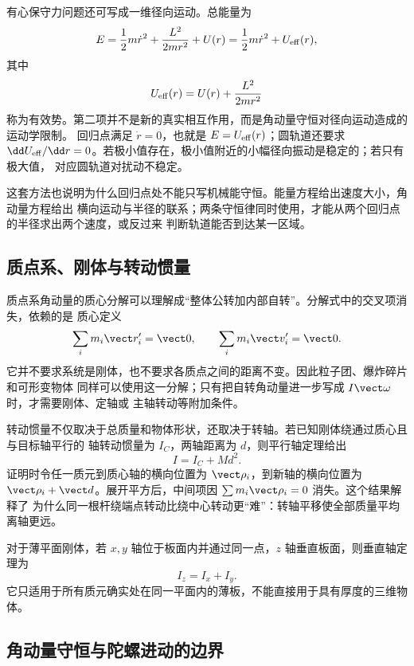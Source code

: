 有心保守力问题还可写成一维径向运动。总能量为
\begin{equation}
 E=\frac12m\dot r^2+\frac{L^2}{2mr^2}+U(r)
 =\frac12m\dot r^2+U_{\rm eff}(r),
\end{equation}
其中
\begin{equation}
 U_{\rm eff}(r)=U(r)+\frac{L^2}{2mr^2}
\end{equation}
称为有效势。第二项并不是新的真实相互作用，而是角动量守恒对径向运动造成的运动学限制。
回归点满足 $\dot r=0$，也就是 $E=U_{\rm eff}(r)$；圆轨道还要求
$\dd U_{\rm eff}/\dd r=0$。若极小值存在，极小值附近的小幅径向振动是稳定的；若只有极大值，
对应圆轨道对扰动不稳定。

这套方法也说明为什么回归点处不能只写机械能守恒。能量方程给出速度大小，角动量方程给出
横向运动与半径的联系；两条守恒律同时使用，才能从两个回归点的半径求出两个速度，或反过来
判断轨道能否到达某一区域。

\subsection*{质点系、刚体与转动惯量}

质点系角动量的质心分解可以理解成“整体公转加内部自转”。分解式中的交叉项消失，依赖的是
质心定义
\begin{equation}
 \sum_i m_i\vect r_i'=\vect0,
 \qquad
 \sum_i m_i\vect v_i'=\vect0.
\end{equation}
它并不要求系统是刚体，也不要求各质点之间的距离不变。因此粒子团、爆炸碎片和可形变物体
同样可以使用这一分解；只有把自转角动量进一步写成 $I\vect\omega$ 时，才需要刚体、定轴或
主轴转动等附加条件。

转动惯量不仅取决于总质量和物体形状，还取决于转轴。若已知刚体绕通过质心且与目标轴平行的
轴转动惯量为 $I_C$，两轴距离为 $d$，则平行轴定理给出
\begin{equation}
 \boxed{I=I_C+Md^2}.
\end{equation}
证明时令任一质元到质心轴的横向位置为 $\vect\rho_i$，到新轴的横向位置为
$\vect\rho_i+\vect d$。展开平方后，中间项因 $\sum m_i\vect\rho_i=0$ 消失。这个结果解释了
为什么同一根杆绕端点转动比绕中心转动更“难”：转轴平移使全部质量平均离轴更远。

对于薄平面刚体，若 $x,y$ 轴位于板面内并通过同一点，$z$ 轴垂直板面，则垂直轴定理为
\begin{equation}
 I_z=I_x+I_y.
\end{equation}
它只适用于所有质元确实处在同一平面内的薄板，不能直接用于具有厚度的三维物体。

\subsection*{角动量守恒与陀螺进动的边界}

